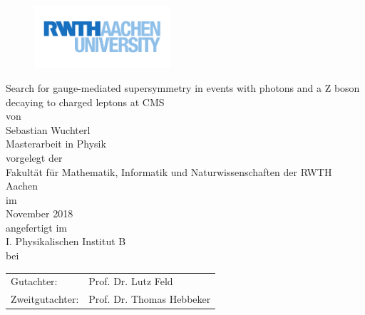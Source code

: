 \thispagestyle{empty}
\begin{figure}[th]
 \flushright
 \includegraphics[width=0.45\textwidth]{figures/rwth}
\end{figure}

\begin{center}
 \Huge
 Search for gauge-mediated supersymmetry in events with photons and a Z boson decaying to charged leptons at CMS
 \\
 \vspace{1.5cm}
 \normalsize
 von\\
 \LARGE
 Sebastian Wuchterl\\
 \vspace{1.0cm}
 \Large
 Masterarbeit in Physik\\
 \vspace{1.5cm}
 \normalsize
 vorgelegt der \\
 \Large
 Fakult\"at f\"ur Mathematik, Informatik und Naturwissenschaften der RWTH Aachen\\
 \vspace{1.5cm}
 \normalsize
 im\\
 \Large
 November 2018\\
 \vspace{1.5cm}
 \normalsize
 angefertigt im\\
 \Large
 I. Physikalischen Institut B\\
 \vspace{1.5cm}
 \normalsize
 bei\par
 \begin{tabular}{ll}
  \Large
  Gutachter:             & \Large Prof. Dr. Lutz Feld       \\
  \Large Zweitgutachter: & \Large Prof. Dr. Thomas Hebbeker 
 \end{tabular}
\end{center}
\thispagestyle{empty}
\restoregeometry
\newpage
